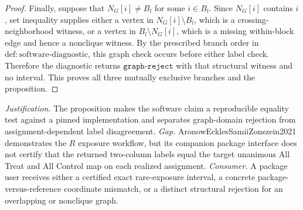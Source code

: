 \documentclass{article}
\begin{document}
\begin{proof}
Finally, suppose that \(N_G[i]\ne B_l\) for some \(i\in B_l\).  Since
\(N_G[i]\) contains \(i\), set inequality supplies either a vertex in
\(N_G[i]\setminus B_l\), which is a crossing-neighborhood witness, or a vertex in
\(B_l\setminus N_G[i]\), which is a missing within-block edge and hence a nonclique witness.  By the prescribed branch order in
\(\mathrm{def{:}software\text{-}diagnostic}\), this graph check occurs before either label check.  Therefore the diagnostic returns
\(\texttt{graph-reject}\) with that structural witness and no interval.  This proves all three mutually exclusive branches and the proposition.
\end{proof}
\par\smallskip\noindent \textit{Justification.} The proposition makes the software claim a reproducible equality test against a pinned implementation and separates graph-domain rejection from assignment-dependent label disagreement. \textit{Gap.} AronowEcklesSamiiZonszein2021 demonstrates the \(R\) exposure workflow, but its companion package interface does not certify that the returned two-column labels equal the target unanimous All Treat and All Control map on each realized assignment. \textit{Consumer.} A package user receives either a certified exact rare-exposure interval, a concrete package-versus-reference coordinate mismatch, or a distinct structural rejection for an overlapping or nonclique graph.
\end{document}
